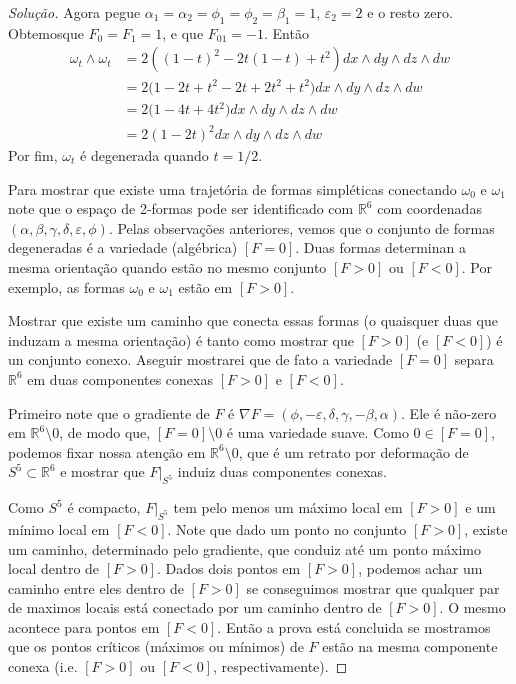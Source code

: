 \begin{proof}[Solução]
Agora pegue $\alpha_1=\alpha_2=\phi_1=\phi_2=\beta_1=1$, $\varepsilon_2=2$ e o resto zero. Obtemosque $F_0=F_1=1$, e que $F_{01}=-1$. Então
\begin{align*}
\omega_t\wedge \omega_t&=2\left( (1-t)^2-2t(1-t)+t^2 \right)  dx\wedge dy\wedge dz\wedge dw\\
&=2\Big( 1-2t+t^2-2t+2t^2+t^2 \Big)dx\wedge dy\wedge dz\wedge dw\\
&=2\Big( 1-4t+4t^2 \Big)dx\wedge dy\wedge dz\wedge dw\\
&=2(1-2t)^2dx\wedge dy\wedge dz\wedge dw
\end{align*}
Por fim, $\omega_t$ é degenerada quando $t=1/2$.

Para mostrar que existe uma trajetória de formas simpléticas conectando $\omega_0$ e $\omega_1$ note que o espaço de 2-formas pode ser identificado com $\mathbb{R}^{6}$ com coordenadas $(\alpha,\beta,\gamma,\delta,\varepsilon,\phi)$. Pelas observações anteriores, vemos que o conjunto de formas degeneradas é a variedade (algébrica) $[F=0]$. Duas formas determinan a mesma  orientação quando estão no mesmo conjunto $[F>0]$ ou  $[F<0]$. Por exemplo, as formas $\omega_0$ e $\omega_1$ estão em $[F>0]$.

Mostrar que existe um caminho que conecta essas formas (o quaisquer duas que induzam a mesma orientação) é tanto como mostrar que $[F>0]$ (e $[F<0]$) é un conjunto conexo. Aseguir mostrarei que de fato a variedade $[F=0]$ separa  $\mathbb{R}^{6}$ em duas componentes conexas $[F>0]$ e  $[F<0]$.

Primeiro note que o gradiente de  $F$ é $\nabla F=(\phi,-\varepsilon,\delta, \gamma,-\beta,\alpha)$. Ele é não-zero em $\mathbb{R}^{6}\setminus 0$, de modo que, $[F=0]\setminus 0$ é uma variedade suave. Como $0\in [F=0]$, podemos fixar nossa atenção em $\mathbb{R}^{6}\setminus 0$, que é um retrato por deformação de $S^5\subset \mathbb{R}^{6}$ e mostrar que $F|_{S^5}$ induiz duas componentes conexas.

Como $S^5$ é compacto, $F|_{S^5}$ tem pelo menos um máximo local em $[F>0]$ e um mínimo local em $[F<0]$. Note que dado um ponto no conjunto $[F>0]$, existe um caminho, determinado pelo gradiente, que conduiz até um ponto máximo local dentro de $[F>0]$. Dados dois pontos em  $[F>0]$, podemos achar um caminho entre eles dentro de  $[F>0]$ se conseguimos mostrar que qualquer par de maximos locais  está conectado por um caminho dentro de $[F>0]$.  O mesmo acontece para pontos em $[F<0]$.  Então a prova está concluida se mostramos que os pontos críticos (máximos ou mínimos) de $F$ estão na mesma componente conexa (i.e. $[F>0]$ ou  $[F<0]$, respectivamente).


\end{proof}
